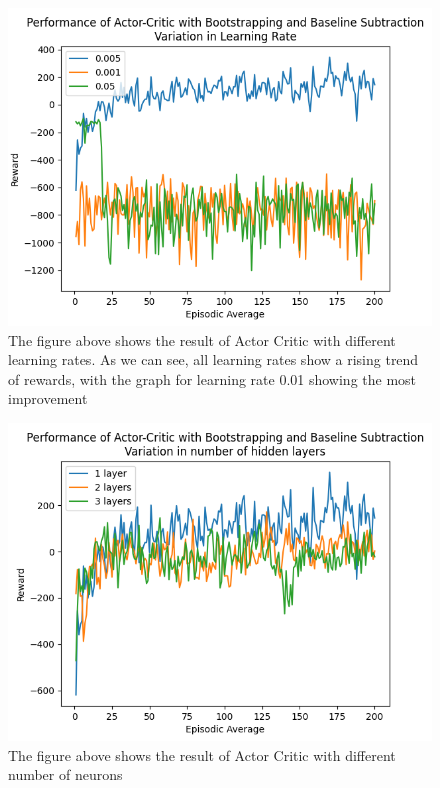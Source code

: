 \documentclass{article}
\begin{document}
\begin{figure}[htbp]
\centering
\includegraphics[width=0.9\linewidth]{Report/images/10.Performance_of_Actor_Critic_BSandBS_LR.png}
\caption{\label{fig:ActorCriticBS2-different learning rates}The figure above shows the result of Actor Critic with different learning rates. As we can see, all learning rates show a rising trend of rewards, with the graph for learning rate 0.01 showing the most improvement}
\end{figure}

\begin{figure}[htbp]
\centering
\includegraphics[width=0.9\linewidth]{Report/images/11.Performance_of_Actor_Critic_BSandBS_Layers.png}
\caption{\label{fig:ActorCriticBS2-different neurons}The figure above shows the result of Actor Critic with different number of neurons}
\end{figure}
\end{document}
